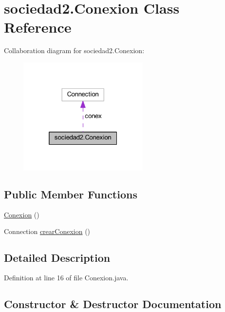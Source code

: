 \hypertarget{classsociedad2_1_1_conexion}{}\section{sociedad2.\+Conexion Class Reference}
\label{classsociedad2_1_1_conexion}


Collaboration diagram for sociedad2.\+Conexion\+:
\nopagebreak
\begin{figure}[H]
\begin{center}
\leavevmode
\includegraphics[width=184pt]{classsociedad2_1_1_conexion__coll__graph}
\end{center}
\end{figure}
\subsection*{Public Member Functions}
\begin{DoxyCompactItemize}
\item 
\mbox{\hyperlink{classsociedad2_1_1_conexion_aae3fae24c8652bee72b7b005756aab29}{Conexion}} ()
\item 
Connection \mbox{\hyperlink{classsociedad2_1_1_conexion_ad17987b39ad24b8954e461a5b4412c7b}{crear\+Conexion}} ()
\end{DoxyCompactItemize}


\subsection{Detailed Description}


Definition at line 16 of file Conexion.\+java.



\subsection{Constructor \& Destructor Documentation}
\mbox{\label{classsociedad2_1_1_conexion_aae3fae24c8652bee72b7b005756aab29}} 
